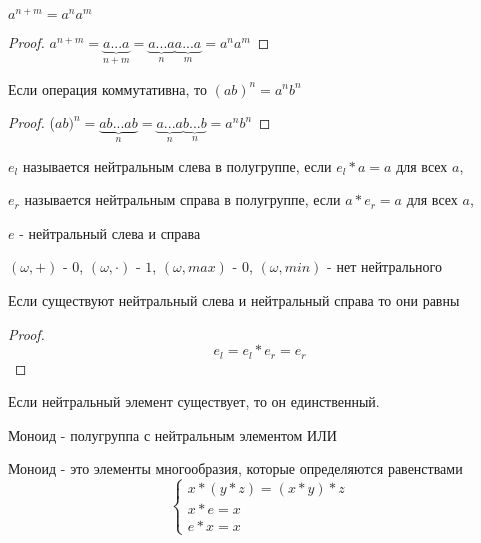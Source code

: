 \documentclass[../main/document.tex]{subfiles}
\begin{document}
\begin{thm}
$a^{n+m}=a^na^m$
\begin{proof}
$a^{n+m}=\underbrace{a...a}_{n+m}=\underbrace{a...a}_n\underbrace{a...a}_m=a^na^m$
\end{proof}
\end{thm}
\begin{thm}
Если операция коммутативна, то $(ab)^n=a^nb^n$
\begin{proof}
($ab)^{n}=\underbrace{ab...ab}_{n}=\underbrace{a...a}_n\underbrace{b...b}_n=a^nb^n$
\end{proof}
\end{thm}
\begin{dfn}
$e_l$ называется нейтральным слева в полугруппе, если $e_l*a=a$ для всех $a$,
\end{dfn}
\begin{dfn}
$e_r$ называется нейтральным справа в полугруппе, если $a*e_r=a$ для всех $a$,
\end{dfn}
\begin{dfn}
$e$ - нейтральный слева и справа
\end{dfn}
\begin{exm}

$(\omega,+)$ - $0$, $(\omega,\cdot)$ - $1$, $(\omega,max)$ - $0$, $(\omega,min)$ - нет нейтрального
\end{exm}
\begin{thm}
Если существуют нейтральный слева и нейтральный справа то они равны
\begin{proof}
$$e_l=e_l*e_r=e_r$$
\end{proof}
\end{thm}
\begin{cnsq}
Если нейтральный элемент существует, то он единственный.
\end{cnsq}
\begin{dfn}[Моноид]
Моноид - полугруппа с нейтральным элементом ИЛИ

Моноид - это элементы многообразия, которые определяются равенствами
$$
\begin{cases}
x*(y*z)=(x*y)*z\\
x*e=x\\
e*x=x
\end{cases}$$
\end{dfn}
\end{document}
